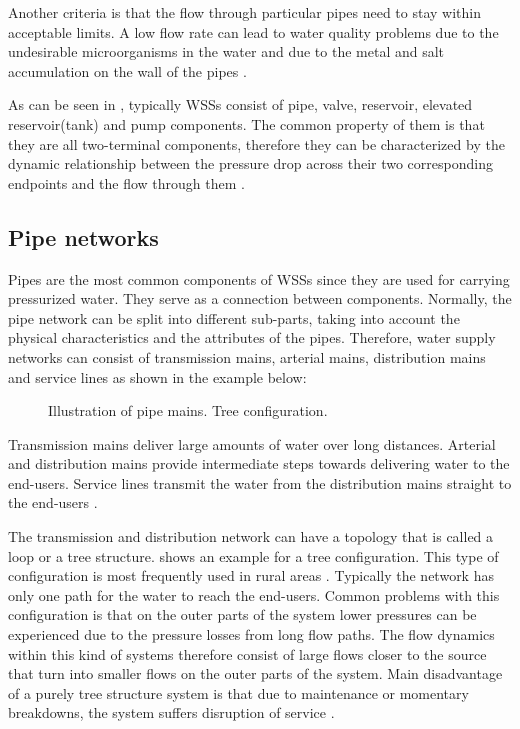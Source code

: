 Another criteria is that the flow through particular pipes need to stay within acceptable limits. A low flow rate can lead to water quality problems due to the undesirable microorganisms in the water and due to the metal and salt accumulation on the wall of the pipes \cite{walski2003advanced}. 

As can be seen in , typically WSSs consist of pipe, valve, reservoir, elevated reservoir(tank) and pump components. The common property of them is that they are all two-terminal components, therefore they can be characterized by the dynamic relationship between the pressure drop across their two corresponding endpoints and the flow through them \cite{master_aau}. 

\subsection{Pipe networks}
\label{pipe_networks}

Pipes are the most common components of WSSs since they are used for carrying pressurized water. They serve as a connection between components. Normally, the pipe network can be split into different sub-parts, taking into account the physical characteristics and the attributes of the pipes. Therefore, water supply networks can consist of transmission mains, arterial mains, distribution mains and service lines as shown in the example below: 

\begin{figure}[H]
\centering
 
\caption{Illustration of pipe mains. Tree configuration.}
\label{fig:pipemain_example}
\end{figure}

Transmission mains deliver large amounts of water over long distances. Arterial and distribution mains provide intermediate steps towards delivering water to the end-users. Service lines transmit the water from the distribution mains straight to the end-users \cite{grigg2012water}.

The transmission and distribution network can have a topology that is called a loop or a tree structure.  shows an example for a tree configuration. This type of configuration is most frequently used in rural areas \cite{mays}. Typically the network has only one path for the water to reach the end-users. Common problems with this configuration is that on the outer parts of the system lower pressures can be experienced due to the pressure losses from long flow paths. The flow dynamics within this kind of systems therefore consist of large flows closer to the source that turn into smaller flows on the outer parts of the system. Main disadvantage of a purely tree structure system is that due to maintenance or momentary breakdowns, the system suffers disruption of service \cite{mays}. 

